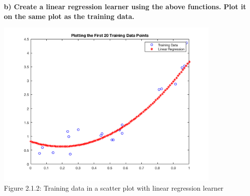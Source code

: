 \documentclass[]{scrreprt}   %
\begin{document}
\textbf{b) Create a linear regression learner using the above functions. Plot it on the same plot as the training data.}
\begin{center}
	\includegraphics[width=30em,keepaspectratio]{p1figure2.png}\\
	{Figure 2.1.2: Training data in a scatter plot with linear regression learner}
\end{center} 
\end{document}
